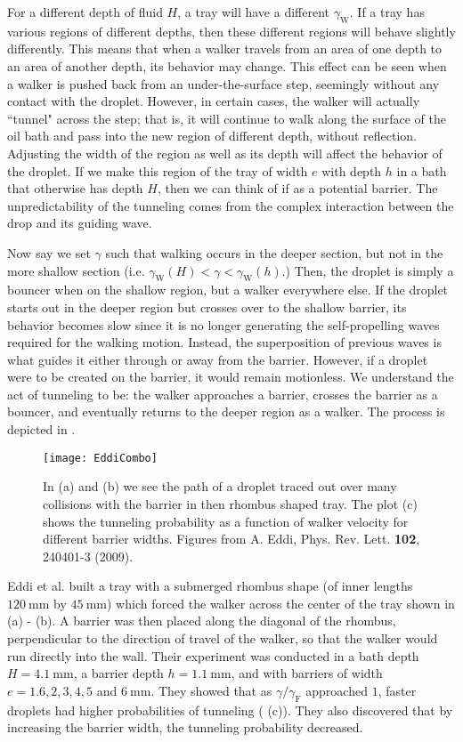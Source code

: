 For a different depth of fluid $H$, a tray will have a different $\gamma_\mathrm{W}$. If a tray has various regions of different depths, then these different regions will behave slightly differently. This means that when a walker travels from an area of one depth to an area of another depth, its behavior may change. This effect can be seen when a walker is pushed back from an under-the-surface step, seemingly without any contact with the droplet. However, in certain cases, the walker will actually ``tunnel" across the step; that is, it will continue to walk along the surface of the oil bath and pass into the new region of different depth, without reflection. Adjusting the width of the region as well as its depth will affect the behavior of the droplet. If we make this region of the tray of width $e$ with depth $h$ in a bath that otherwise has depth $H$, then we can think of if as a potential barrier. The unpredictability of the tunneling comes from the complex interaction between the drop and its guiding wave. 

Now say we set $\gamma$ such that walking occurs in the deeper section, but not in the more shallow section (i.e.  $\gamma_\mathrm{W}(H)<\gamma<\gamma_\mathrm{W}(h)$.) Then, the droplet is simply a bouncer when on the shallow region, but a walker everywhere else. If the droplet starts out in the deeper region but crosses over to the shallow barrier, its behavior becomes slow since it is no longer generating the self-propelling waves required for the walking motion. Instead, the superposition of previous waves is what guides it either through or away from the barrier. However, if a droplet were to be created on the barrier, it would remain motionless. We understand the act of tunneling to be: the walker approaches a barrier, crosses the barrier as a bouncer, and eventually returns to the deeper region as a walker. The process is depicted in . 

\begin{figure}[]
  \texttt{[image: EddiCombo]}
\caption{In (a) and (b) we see the path of a droplet traced out over many collisions with the barrier in then rhombus shaped tray. The plot (c) shows the tunneling probability as a function of walker velocity for different barrier widths. Figures from A. Eddi, Phys. Rev. Lett. \textbf{102}, 240401-3 (2009).}
\label{fig:Eddi}
	\end{figure}

Eddi et al. built a tray with a submerged rhombus shape (of inner lengths $120~\mathrm{mm}$ by $45~\mathrm{mm}$) which forced the walker across the center of the tray shown in  (a) - (b). A barrier was then placed along the diagonal of the rhombus, perpendicular to the direction of travel of the walker, so that the walker would run directly into the wall. Their experiment was conducted in a bath depth $H = 4.1~\mathrm{mm}$, a barrier depth $h = 1.1~\mathrm{mm}$, and with barriers of width $e = 1.6, 2, 3, 4, 5 $ and $ 6~\mathrm{mm}$. They showed that as $\gamma/\gamma_\mathrm{F}$ approached $1$, faster droplets had higher probabilities of tunneling ( (c)). They also discovered that by increasing the barrier width, the tunneling probability decreased. 


